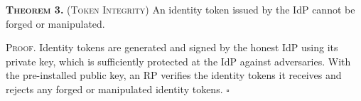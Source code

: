 

\newc
\vspace{2mm}
\noindent\textsc{\textbf{Theorem 3.} (Token Integrity)} { An identity token issued by the IdP cannot be forged or manipulated.}



\vspace{0.75mm}
\noindent \textsc{Proof.} Identity tokens are generated and signed by the honest IdP using its private key, which is sufficiently protected at the IdP against adversaries.
With the pre-installed public key, an RP verifies the identity tokens it receives and rejects any forged or manipulated identity tokens. \hfill $\square$


